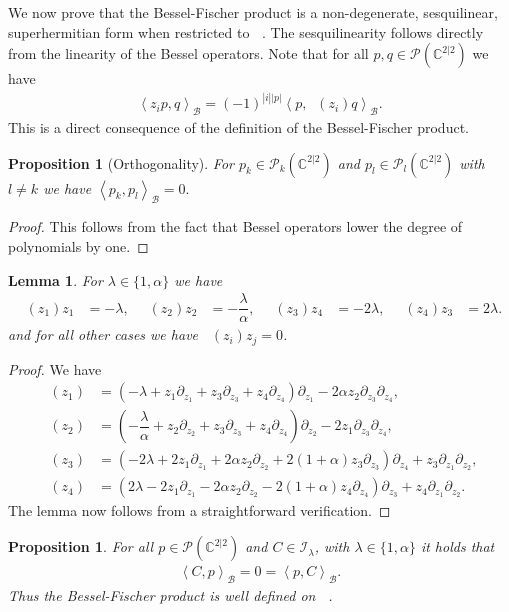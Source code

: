 \documentclass{amsart}
\newtheorem{Prop}[theorem]{Proposition}
\newtheorem{lemma}[theorem]{Lemma}
\numberwithin{theorem}{section}
\theoremstyle{definition}
\theoremstyle{remark}
\def\C{\mathds{C} }
\DeclareMathOperator{\bessel}{\mathcal B_\lambda}
\DeclareMathOperator{\Fock}{\mc F_\lambda}
\newcommand{\bfip}[1]{\left<{#1}\right>_\mathcal B}
\newcommand{\pt}[1]{\partial_{#1}}
\newcommand{\mc}[1]{\mathcal{#1}}
\newcommand{\Ila}{\mc I_\lambda}
\begin{document}
We now prove that the Bessel-Fischer product is a non-degenerate, sesquilinear, superhermitian form when restricted to $\Fock$. The sesquilinearity follows directly from the linearity of the Bessel operators. Note that for all $p, q\in \mc P(\C^{2|2})$ we have
\begin{align*}
\bfip{z_i p,q} = (-1)^{|i||p|}\bfip{ p,\bessel(z_i)q}.
\end{align*}
This is a direct consequence of the definition of the Bessel-Fischer product.

\begin{Prop}[Orthogonality]\label{PropOrthog}
For $p_k\in \mathcal P_k(\C^{2|2})$ and $p_l\in \mathcal P_l(\C^{2|2})$ with $l\neq k$ we have
$\bfip{p_k, p_l} = 0.$
\end{Prop}
\begin{proof}
This follows from the fact that Bessel operators lower the degree of polynomials by one.
\qedhere
\end{proof}

\begin{lemma}\label{LemBess}
For $\lambda\in\{1,\alpha\}$ we have
\begin{align*}
\bessel(z_1)z_1 &= -\lambda, & \bessel(z_2)z_2 &= -\dfrac{\lambda}{\alpha}, & \bessel(z_3)z_4 &= -2\lambda, & \bessel(z_4)z_3 &= 2\lambda.
\end{align*}
and for all other cases we have $\bessel(z_i)z_j=0$.
\end{lemma}

\begin{proof}
We have
\begin{align*}
\bessel(z_1) &= (-\lambda+z_1\pt {z_1} + z_3\pt {z_3} + z_4\pt {z_4})\pt {z_1} -2\alpha {z_2} \pt {z_3} \pt {z_4}, \\
\bessel(z_2) &= (-\dfrac{\lambda}{\alpha}+{z_2}\pt {z_2} + z_3\pt {z_3} + z_4\pt {z_4})\pt {z_2} -2 z_1 \pt {z_3} \pt {z_4},\\
\bessel(z_3) &= (-2\lambda + 2z_1\pt {z_1} + 2\alpha {z_2}\pt {z_2} + 2(1+\alpha)z_3\pt {z_3})\pt {z_4} + {z_3} \pt {z_1} \pt {z_2},\\
\bessel(z_4) &= (2\lambda - 2z_1\pt {z_1} - 2\alpha {z_2}\pt {z_2} - 2(1+\alpha)z_4\pt {z_4})\pt {z_3} + z_4 \pt {z_1} \pt {z_2}.
\end{align*}
The lemma now follows from a straightforward verification.
\end{proof}

\begin{Prop}\label{Restriction}
For all $p\in \mc P(\C^{2|2})$ and $C \in \Ila$, with $\lambda\in\{1,\alpha\}$ it holds that
\begin{align*}
\bfip{C,p} =0 = \bfip{p,C}.
\end{align*}
Thus the Bessel-Fischer product is well defined on $\Fock$.  
\end{Prop}
\end{document}

